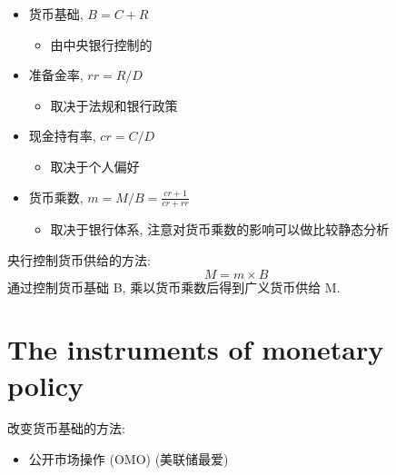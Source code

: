 \begin{proposition}[货币供给模型]
    \begin{itemize}
        \item 货币基础, $B = C + R$
        \begin{itemize}
            \item 由中央银行控制的
        \end{itemize}
        \item 准备金率, $rr = R/D$
        \begin{itemize}
            \item 取决于法规和银行政策
        \end{itemize}
        \item 现金持有率, $cr = C/D$
        \begin{itemize}
            \item 取决于个人偏好
        \end{itemize}
        \item 货币乘数, $m = M/B = \frac{cr+1}{cr+rr}$
        \begin{itemize}
            \item 取决于银行体系, 注意对货币乘数的影响可以做比较静态分析
        \end{itemize}
    \end{itemize}
\end{proposition}
\begin{theorem}
    央行控制货币供给的方法:
    $$M = m \times B$$
    通过控制货币基础 B, 乘以货币乘数后得到广义货币供给 M.
\end{theorem}

\section{The instruments of monetary policy}
改变货币基础的方法:
\begin{itemize}
    \item 公开市场操作 (OMO) (美联储最爱)
\end{itemize}

%
